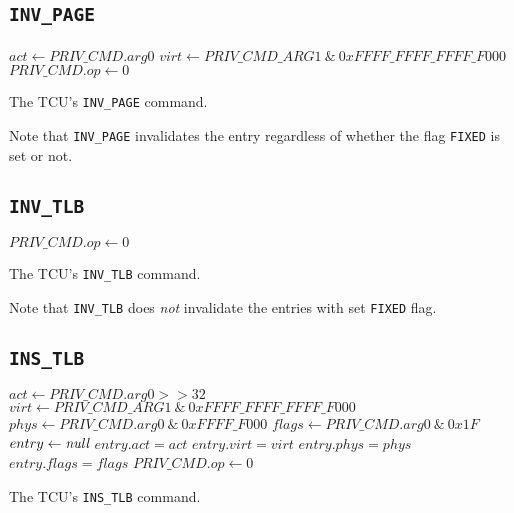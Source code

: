 \subsection{\texttt{INV\_PAGE}}

\begin{algorithm}[H]
    \colorbox{tilemux}{$act \gets PRIV\_CMD.arg0$}\;
    $virt \gets PRIV\_CMD\_ARG1\ \&\ 0xFFFF\_FFFF\_FFFF\_F000$\;
    \BlankLine
    \BlankLine
    $PRIV\_CMD.op \gets 0$\;
    \caption{The TCU's \texttt{INV\_PAGE} command.}
\end{algorithm}

\noindent Note that \texttt{INV\_PAGE} invalidates the entry regardless of whether the flag
\texttt{FIXED} is set or not.

\subsection{\texttt{INV\_TLB}}

\begin{algorithm}[H]
    \BlankLine
    $PRIV\_CMD.op \gets 0$\;
    \caption{The TCU's \texttt{INV\_TLB} command.}
\end{algorithm}

\noindent Note that \texttt{INV\_TLB} does \emph{not} invalidate the entries with set \texttt{FIXED}
flag.

\subsection{\texttt{INS\_TLB}}

\begin{algorithm}[H]
    \colorbox{tilemux}{$act \gets PRIV\_CMD.arg0 >> 32$}\;
    $virt \gets PRIV\_CMD\_ARG1\ \&\ 0xFFFF\_FFFF\_FFFF\_F000$\;
    $phys \gets PRIV\_CMD.arg0\ \&\ 0xFFFF\_F000$\;
    $flags \gets PRIV\_CMD.arg0\ \&\ 0x1F$\;
    \BlankLine
    $entry \gets \emph{null}$\;
    \BlankLine
    \BlankLine
    \colorbox{tilemux}{$entry.act = act$}\;
    $entry.virt = virt$\;
    $entry.phys = phys$\;
    $entry.flags = flags$\;
    $PRIV\_CMD.op \gets 0$\;
    \caption{The TCU's \texttt{INS\_TLB} command.}
\end{algorithm}
\extend{}

